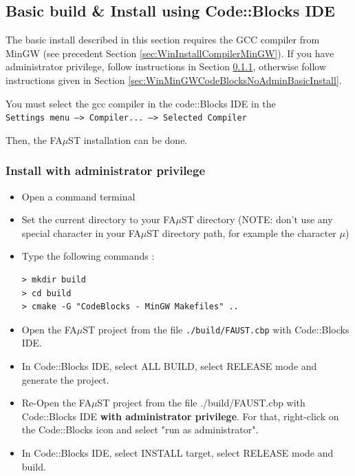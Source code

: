\subsection{Basic build \& Install using Code::Blocks IDE}
\label{sec:WinCodeBlocksBasicInstall}

The basic install described in this section requires the GCC compiler from MinGW (see precedent Section \ref{sec:WinInstallCompilerMinGW}).
If you have administrator privilege, follow instructions in Section \ref{sec:WinMinGWCodeBlocksAdminBasicInstall}, otherwise follow instructions given in Section \ref{sec:WinMinGWCodeBlocksNoAdminBasicInstall}.

You must select the gcc compiler in the code::Blocks IDE in the \\ \texttt{Settings menu --> Compiler... --> Selected Compiler }  

Then, the FA$\mu$ST installation can be done. 

\subsubsection{Install with administrator privilege}
\label{sec:WinMinGWCodeBlocksAdminBasicInstall}
\begin{itemize}
\item Open a command terminal
\item Set the current directory to your FA$\mu$ST directory (NOTE: don't use any special character in your FA$\mu$ST directory path, for example the character $\mu$)
\item Type the following commands : 

\lstset{style=customBash}
\begin{lstlisting}
> mkdir build
> cd build
> cmake -G "CodeBlocks - MinGW Makefiles" .. 
\end{lstlisting}
\item Open the FA$\mu$ST project from the file \texttt{./build/FAUST.cbp} with Code::Blocks IDE.
\item In Code::Blocks IDE, select ALL BUILD, select RELEASE mode and generate the project.
\item Re-Open the FA$\mu$ST project from the file ./build/FAUST.cbp with Code::Blocks IDE \textbf{with administrator privilege}. For that, right-click on the Code::Blocks icon and select "run as administrator". 
\item In Code::Blocks IDE, select INSTALL target, select RELEASE mode and build.
\end{itemize}

